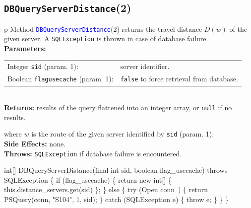\subsection{\texttt{DBQueryServerDistance}(2)}
\begin{tabular}{p{\textwidth}}
\toprule
{}
Method \textcolor{blue}{{\tt{}\protect{}DBQueryServerDistance}}(2) returns the
travel distance $D(w)$ of the given server.
A {\tt{}SQLException} is thrown in case of database failure.\\
\midrule
\textbf{Parameters:} \\
\begin{tabular}{lp{116mm}}
Integer {\tt{}sid} (param. 1):&server identifier.\\
Boolean {\tt{}flag{\char95}usecache} (param. 1):&{\tt{}false} to force retrieval from database.
\end{tabular}\\
\textbf{Returns:} results of the query flattened into an integer array,
or {\tt{}null} if no results.


where $w$ is the route of the given server identified by {\tt{}sid} (param. 1).\\
\textbf{Side Effects:} none.\\
\textbf{Throws:} {\tt{}SQLException} if database failure is encountered.\\
\bottomrule
\end{tabular}
\nwenddocs{}\endmoddef{}
int[] DBQueryServerDistance(final int sid, boolean flag_usecache) throws SQLException \{
  if (flag_usecache) \{
    return new int[] \{ this.distance_servers.get(sid) \};
  \} else \{
    try (\LA{}Open \code{}conn\edoc{}~{\nwtagstyle{}}\RA{}) \{
      return PSQuery(conn, "S104", 1, sid);
    \} catch (SQLException e) \{
      throw e;
    \}
  \}
\}
\eatline
{}\nwendcode{}\nwdocspar
